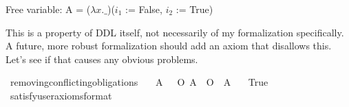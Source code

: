 \begin{isabellebody}
{  Free variable:
    A = ($\lambda x. \_$)($i_1$ := False, $i_2$ := True) \color{black}%
}\isanewline
%
%
\endisatagproof
{\isafoldproof}%
%
\isadelimproof
%
\endisadelimproof
%
\begin{isamarkuptext}%
This is a property of DDL itself, not necessarily of my formalization specifically. A future, 
more robust formalization should add an axiom that disallows this. Let's see if that causes any obvious 
problems.%
\end{isamarkuptext}\isamarkuptrue%
\isamarkupfalse%
\ removing{\isacharunderscore}conflicting{\isacharunderscore}obligations{\isacharcolon}\isanewline
\ \ \ {\isachardoublequoteopen}{\isasymforall}A{\isachardot}\ {\isasymTurnstile}\ {\isacharparenleft}\isactrlbold {\isasymnot}\ {\isacharparenleft}O\ {\isacharbraceleft}A{\isacharbraceright}\ \isactrlbold {\isasymand}\ O\ {\isacharbraceleft}\isactrlbold {\isasymnot}\ A{\isacharbraceright}{\isacharparenright}{\isacharparenright}{\isachardoublequoteclose}\isanewline
\ \ \ True\isanewline
\ \ \isamarkupfalse%
\ {\isacharbrackleft}satisfy{\isacharcomma}user{\isacharunderscore}axioms{\isacharcomma}format{\isacharequal}{}{\isacharbrackright}%
\isadelimproof
\ %
\endisadelimproof
%
\isatagproof
{}\isamarkupfalse%
\isanewline
%
\end{isabellebody}
